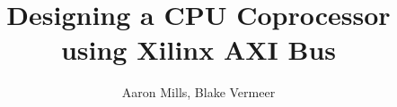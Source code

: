 \documentclass[journal]{IEEEtran}
\begin{document}
%
\title{Designing a CPU Coprocessor using Xilinx AXI Bus }
%
%
%

\author{Aaron Mills, Blake Vermeer}%


% 
%



%
{}
% 




\end{document}
